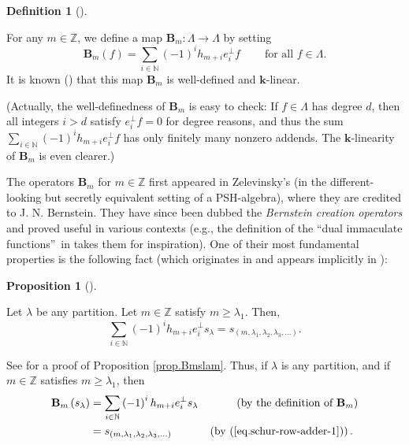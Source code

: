 \documentclass[numbers=enddot,12pt,final,onecolumn,notitlepage]{scrartcl}%
\theoremstyle{definition}
\newtheorem{prop}[theo]{Proposition}
\newenvironment{proposition}[1][]
{\begin{prop}[#1]\begin{leftbar}}
{\end{leftbar}\end{prop}}
\newtheorem{defi}[theo]{Definition}
\newenvironment{definition}[1][]
{\begin{defi}[#1]\begin{leftbar}}
{\end{leftbar}\end{defi}}
\let\sumnonlimits\sum
\renewcommand{\sum}{\sumnonlimits\limits}
\begin{document}
\begin{definition}
For any $m\in\mathbb{Z}$, we define a map $\mathbf{B}_{m}:\Lambda
\rightarrow\Lambda$ by setting%
\[
\mathbf{B}_{m}\left(  f\right)  =\sum_{i\in\mathbb{N}}\left(  -1\right)
^{i}h_{m+i}e_{i}^{\perp}f\ \ \ \ \ \ \ \ \ \ \text{for all }f\in
\Lambda\text{.}%
\]
It is known (\cite[Exercise 2.9.1(a)]{GriRei}) that this map $\mathbf{B}_{m}$
is well-defined and $\mathbf{k}$-linear.
\end{definition}

(Actually, the well-definedness of $\mathbf{B}_{m}$ is easy to check: If
$f\in\Lambda$ has degree $d$, then all integers $i>d$ satisfy $e_{i}^{\perp
}f=0$ for degree reasons, and thus the sum $\sum_{i\in\mathbb{N}}\left(
-1\right)  ^{i}h_{m+i}e_{i}^{\perp}f$ has only finitely many nonzero addends.
The $\mathbf{k}$-linearity of $\mathbf{B}_{m}$ is even clearer.)

The operators $\mathbf{B}_{m}$ for $m\in\mathbb{Z}$ first appeared in
Zelevinsky's \cite[\S 4.20]{Zelevi81} (in the different-looking but secretly
equivalent setting of a PSH-algebra), where they are credited to J. N.
Bernstein. They have since been dubbed the \emph{Bernstein creation operators}
and proved useful in various contexts (e.g., the definition of the
\textquotedblleft dual immaculate functions\textquotedblright\ in
\cite{BBSSZ13} takes them for inspiration). One of their most fundamental
properties is the following fact (which originates in \cite[4.20, ($\ast\ast
$)]{Zelevi81} and appears implicitly in \cite[Chapter I, Section 5, Example
29]{Macdon95}):

\begin{proposition}
\label{prop.Bmslam}Let $\lambda$ be any partition. Let $m\in\mathbb{Z}$
satisfy $m\geq\lambda_{1}$. Then,%
\begin{equation}
\sum_{i\in\mathbb{N}}\left(  -1\right)  ^{i}h_{m+i}e_{i}^{\perp}s_{\lambda
}=s_{\left(  m,\lambda_{1},\lambda_{2},\lambda_{3},\ldots\right)  }.
\label{eq.schur-row-adder-1}%
\end{equation}

\end{proposition}

See \cite[Exercise 2.9.1(b)]{GriRei} for a proof of Proposition
\ref{prop.Bmslam}. Thus, if $\lambda$ is any partition, and if $m\in
\mathbb{Z}$ satisfies $m\geq\lambda_{1}$, then%
\begin{align}
\mathbf{B}_{m}\left(  s_{\lambda}\right)   &  =\sum_{i\in\mathbb{N}}\left(
-1\right)  ^{i}h_{m+i}e_{i}^{\perp}s_{\lambda}\ \ \ \ \ \ \ \ \ \ \left(
\text{by the definition of }\mathbf{B}_{m}\right) \nonumber\\
&  =s_{\left(  m,\lambda_{1},\lambda_{2},\lambda_{3},\ldots\right)
}\ \ \ \ \ \ \ \ \ \ \left(  \text{by (\ref{eq.schur-row-adder-1})}\right)  .
\label{eq.schur-row-adder-2}%
\end{align}
\end{document}
